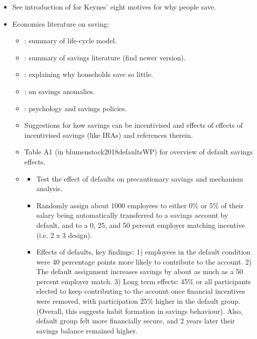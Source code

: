 \documentclass[a4paper, 11pt]{report}
\begin{document}
\begin{itemize}

	\item See introduction of \citet{browning1996household} for Keynes' eight motives for why people save.

	\item Economics literature on saving:
	\begin{itemize}
		\item \citet{browning2001life}: summary of life-cycle model.

		\item \citet{browning1996household}: summary of savings literature (find newer version).

		\item \citet{lusardi2000explaining}: explaining why households save so little.

		\item \citet{thaler1990anomalies}: on savings anomalies.

		\item \citet{thaler1994psychology}: psychology and savings policies.

		\item Suggestions for how savings can be incentivised \citep{thaler1994psychology} and effects of effects of incentivised savings (like IRAs) \citep{middleton2018lifting} and references therein.

		\item \citet{blumenstock2018defaults} Table A1 (in blumenstock2018defaultsWP) for overview of default savings effects.

		\item \citet{blumenstock2018defaults}
		\begin{itemize}
			\item Test the effect of defaults on precautionary savings and mechanism analysis.

			\item Randomly assign about 1000 employees to either 0\% or 5\% of their salary being automatically transferred to a savings account by default, and to a 0, 25, and 50 percent employer matching incentive (i.e. 2 x 3 design).

			\item Effects of defaults, key findings: 1) employees in the default condition were 40 percentage points more likely to contribute to the account. 2) The default assignment increases savings by about as much as a 50 percent employer match. 3) Long term effects: 45\% or all participants elected to keep contributing to the account once financial incentives were removed, with participation 25\% higher in the default group. (Overall, this suggests habit formation in savings behaviour). Also, default group felt more financially secure, and 2 years later their savings balance remained higher.


\end{itemize}
\end{itemize}
\end{itemize}
\end{document}
